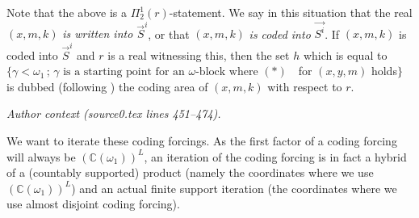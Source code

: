 \documentclass[10pt,a4paper]{amsart}
\begin{document}
Note that the above is a $\Pi^1_2(r)$-statement.
We say in this situation that the real $(x,m,k)$\emph{ is written into $\vec{S}^i$}, or that $(x,m,k)$ \emph{is coded into} $\vec{S^i}$.
If $(x,m,k)$ is coded into $\vec{S}^i$ and $r$ is a real witnessing this, then the set $h$ which is equal to $\{ \gamma < \omega_1 \, ;\, \gamma \text{ is a starting point for an $\omega$-block where $(\ast)$ }$ for $(x,y,m)$ holds$\}$ is dubbed (following \cite{FS}) the coding area of $(x,m,k)$ with respect to $r$.
\par\medskip\noindent\textit{Author context (source0.tex lines 451--474).}\par\smallskip
We want to iterate these coding forcings. As the first factor of a coding forcing will always be $(\mathbb{C}(\omega_1))^L$, an iteration of the coding forcing is in fact a hybrid of a (countably supported) product (namely the coordinates where we use $(\mathbb{C}(\omega_1))^L$)  and an actual finite support iteration (the coordinates where we use almost disjoint coding forcing).
\end{document}
